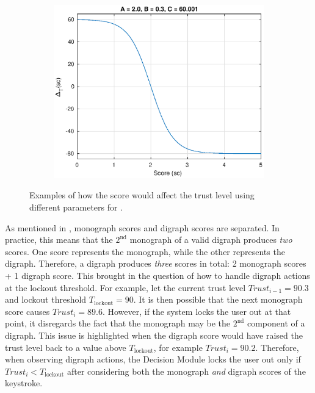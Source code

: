 \begin{figure}[!htbp]
\begin{subfigure}[b]{0.5\textwidth}
    \includegraphics[width=\textwidth, height=0.26\textheight]{figures/inflSig.eps}
    \label{fig:sigmoid3}
  \end{subfigure}
  
  \caption{Examples of how the score would affect the trust level using different parameters for .}
  \label{fig:sigmoids}
\end{figure}

As mentioned in , monograph scores and digraph scores are separated.
In practice, this means that the $2^{\text{nd}}$ monograph of a valid digraph produces \textit{two} scores.
One score represents the monograph, while the other represents the digraph.
Therefore, a digraph produces \textit{three} scores in total: 2 monograph scores + 1 digraph score. 
This brought in the question of how to handle digraph actions at the lockout threshold.
For example, let the current trust level $Trust_{i-1} = 90.3$ and lockout threshold $T_{\text{lockout}} = 90$.
It is then possible that the next monograph score causes $Trust_i = 89.6$.
However, if the system locks the user out at that point, it disregards the fact that the monograph may be the $2^{\text{nd}}$ component of a digraph.
This issue is highlighted when the digraph score would have raised the trust level back to a value above $T_{\text{lockout}}$, for example $Trust_i = 90.2$.
Therefore, when observing digraph actions, the Decision Module locks the user out only if $Trust_i < T_{\text{lockout}}$ after considering both the monograph \textit{and} digraph scores of the keystroke.

